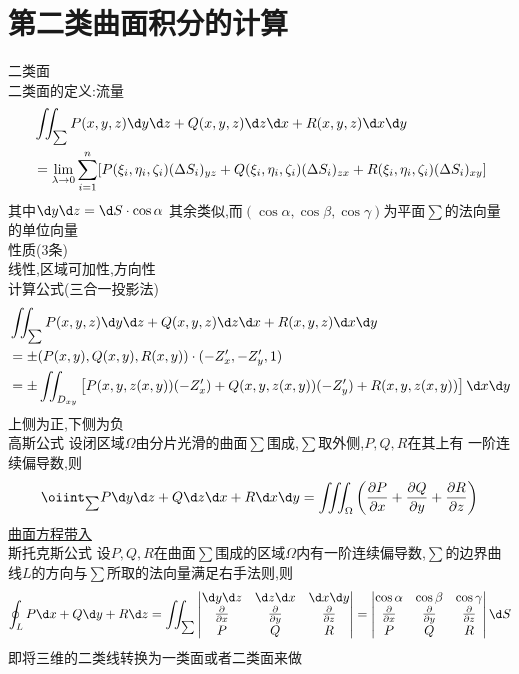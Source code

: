 \documentclass[12pt, a4paper, oneside, UTF8]{ctexbook}
\begin{document}
\section{第二类曲面积分的计算}
\begin{remark}
    二类面 \\
    二类面的定义:流量
    \begin{align*}
        &\iint_{\sum}P(x,y,z)\d y\d z + Q(x,y,z)\d z\d x + R(x,y,z)\d x\d y \\
        &=\lim_{\lambda\to 0} \sum_{i=1}^{n}[P(\xi_i,\eta_i,\zeta_i)(\Delta S_i)_{yz}+
    Q(\xi_i,\eta_i,\zeta_i)(\Delta S_i)_{zx}+R(\xi_i,\eta_i,\zeta_i)(\Delta S_i)_{xy}]
    \end{align*}
    其中$\d y\d z = \d S\cdot\cos\alpha$ 其余类似,而$(\cos\alpha,\cos\beta,\cos\gamma)$为平面$\sum$的法向量的单位向量 \\
    性质(3条) \\
    线性,区域可加性,方向性 \\
    计算公式(三合一投影法)
    \begin{align*}
    &\iint_{\sum}P(x,y,z)\d y\d z + Q(x,y,z)\d z\d x + R(x,y,z)\d x\d y \\
    &=\pm (P(x,y),Q(x,y),R(x,y))\cdot (-Z'_x,-Z'_y,1) \\
    &=\pm \iint_{D_{xy}}\left[P(x,y,z(x,y))(-Z'_x)+Q(x,y,z(x,y))(-Z'_y)+R(x,y,z(x,y))\right]\d x\d y
    \end{align*}
    上侧为正,下侧为负 \\
    {\color{red} 高斯公式} 设闭区域$\Omega$由分片光滑的曲面$\sum$围成,$\sum$取{\color{red}外侧},$P,Q,R$在其上有{\color{red} 一阶连续偏导数},则
    $$
    \oiint_{\sum}P\d y\d z + Q\d z\d x + R\d x\d y=
    \iiint_{\Omega}\left(\frac{\partial P}{\partial x} + \frac{\partial Q}{\partial y} + \frac{\partial R}{\partial z}\right)
    $$
    \underline{曲面方程带入} \\
    {\color{red} 斯托克斯公式} 设$P,Q,R$在曲面$\sum$围成的区域$\Omega$内有一阶连续偏导数,$\sum$的边界曲线$L$的方向与$\sum$所取的法向量满足右手法则,则
    $$
    \oint_{L}P\d x + Q\d y + R\d z = \iint_{\sum}\begin{vmatrix}
        \d y\d z & \d z\d x & \d x\d y \\
        \frac{\partial}{\partial x} & \frac{\partial}{\partial y} & \frac{\partial}{\partial z} \\
        P & Q & R
    \end{vmatrix} = \begin{vmatrix}
        \cos\alpha & \cos\beta & \cos\gamma \\
        \frac{\partial}{\partial x} & \frac{\partial}{\partial y} & \frac{\partial}{\partial z} \\
        P & Q & R
    \end{vmatrix}\d S
    $$
    即将三维的二类线转换为一类面或者二类面来做
\end{remark}
\end{document}
